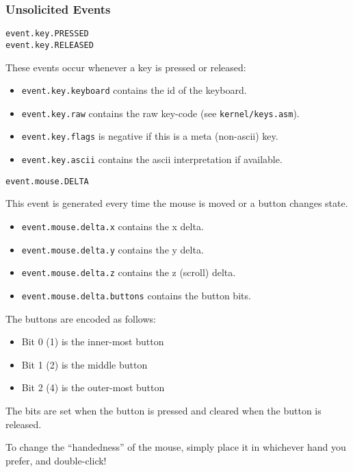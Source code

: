 \subsubsection*{Unsolicited Events}
\begin{verbatim}
event.key.PRESSED
event.key.RELEASED
\end{verbatim}

These events occur whenever a key is pressed or released:

\begin{itemize}
    \item \verb+event.key.keyboard+ contains the id of the keyboard.
    \item \verb+event.key.raw+ contains the raw key-code (see \verb+kernel/keys.asm+).
    \item \verb+event.key.flags+ is negative if this is a meta (non-ascii) key.
    \item \verb+event.key.ascii+ contains the ascii interpretation if available.
\end{itemize}

\begin{verbatim}
event.mouse.DELTA
\end{verbatim}

This event is generated every time the mouse is moved or a button changes state.

\begin{itemize}
\item \verb+event.mouse.delta.x+ contains the x delta.
\item \verb+event.mouse.delta.y+ contains the y delta.
\item \verb+event.mouse.delta.z+ contains the z (scroll) delta.
\item \verb+event.mouse.delta.buttons+ contains the button bits.
\end{itemize}

The buttons are encoded as follows:

\begin{itemize}
\item Bit 0 (1) is the inner-most button
\item Bit 1 (2) is the middle button
\item Bit 2 (4) is the outer-most button
\end{itemize}

The bits are set when the button is pressed and cleared when the button is released.

To change the ``handedness'' of the mouse, simply place it in whichever hand you prefer, and double-click!  

